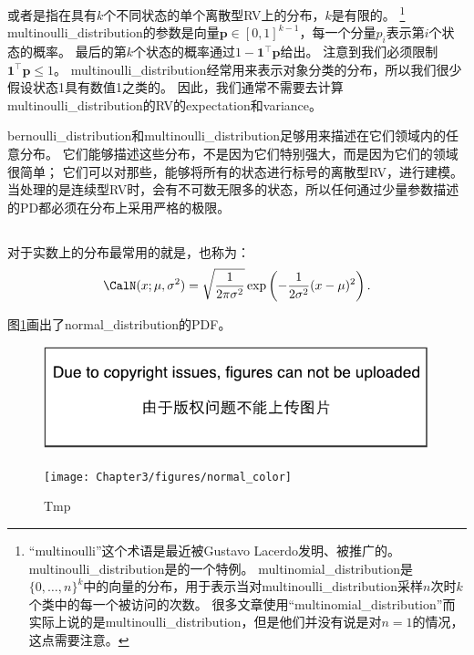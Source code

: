 或者是指在具有$k$个不同状态的单个离散型\gls{RV}上的分布，$k$是有限的。
\footnote{``multinoulli''这个术语是最近被Gustavo Lacerdo发明、被\cite{MurphyBook2012}推广的。
\gls{multinoulli_distribution}是的一个特例。
\gls{multinomial_distribution}是$\{0,\ldots, n\}^k$中的向量的分布，用于表示当对\gls{multinoulli_distribution}采样$n$次时$k$个类中的每一个被访问的次数。
很多文章使用``\gls{multinomial_distribution}''而实际上说的是\gls{multinoulli_distribution}，但是他们并没有说是对$n=1$的情况，这点需要注意。}
\gls{multinoulli_distribution}的参数是向量$\bm{p} \in [0, 1]^{k-1}$，每一个分量$p_i$表示第$i$个状态的概率。
最后的第$k$个状态的概率通过$1-\bm{1}^\top \bm{p}$给出。
注意到我们必须限制$\bm{1}^\top\bm{p}\le 1$。
\gls{multinoulli_distribution}经常用来表示对象分类的分布，所以我们很少假设状态1具有数值1之类的。
因此，我们通常不需要去计算\gls{multinoulli_distribution}的\gls{RV}的\gls{expectation}和\gls{variance}。


\gls{bernoulli_distribution}和\gls{multinoulli_distribution}足够用来描述在它们领域内的任意分布。
它们能够描述这些分布，不是因为它们特别强大，而是因为它们的领域很简单；
它们可以对那些，能够将所有的状态进行标号的离散型\gls{RV}，进行建模。
当处理的是连续型\gls{RV}时，会有不可数无限多的状态，所以任何通过少量参数描述的\gls{PD}都必须在分布上采用严格的极限。

\subsection{}
\label{sec:gaussian_distribution}


对于实数上的分布最常用的就是，也称为：
\begin{equation}
\CalN(x; \mu, \sigma^2) = \sqrt{\frac{1}{2\pi \sigma^2}} \exp \left ( -\frac{1}{2\sigma^2} (x-\mu)^2 \right ).
\end{equation}

图\ref{fig:chap3_normal_color}画出了\gls{normal_distribution}的\gls{PDF}。
\begin{figure}[!htb]
\ifOpenSource
\centerline{\includegraphics{figure.pdf}}
\else
\centerline{\texttt{[image: Chapter3/figures/normal\_color]}}
\fi
\caption{Tmp}
\label{fig:chap3_normal_color}
\end{figure}

